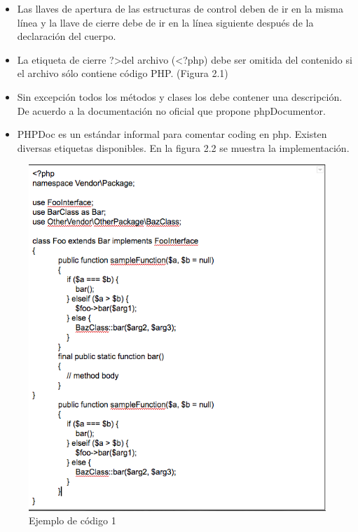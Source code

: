 \begin{itemize}
\begin{itemize}
\begin{itemize}
				\item Las llaves de apertura de las estructuras de control deben de ir en la misma línea y la llave de cierre debe de ir en la línea siguiente después de la declaración del cuerpo.

				\item La etiqueta de cierre ?\textgreater del archivo (\textless ?php) debe ser omitida del contenido si el archivo sólo contiene código PHP. (Figura 2.1)
				
				\item Sin excepción todos los métodos y clases los debe contener una descripción. De acuerdo a la documentación no oficial que propone phpDocumentor.

				
				\item PHPDoc es un estándar informal para comentar coding en php. Existen diversas etiquetas disponibles. En la figura 2.2 se muestra la implementación.

			\end{itemize}
	\end{itemize}
\end{itemize}

				\begin{figure}[htbp!]
		\centering
			\includegraphics[width=.8\textwidth]{images/ejemploCodigo1}
		\caption{Ejemplo de código 1}
	\end{figure}
				

